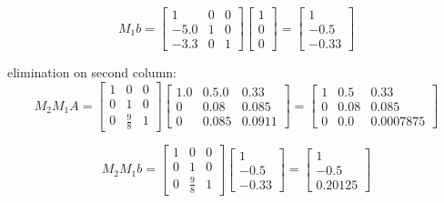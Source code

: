 \documentclass[11pt,twoside]{article}
\begin{document}
\begin{enumerate}
\begin{enumerate}
				 \[ M_1 b = 
				\left. \begin{bmatrix}
				1& 0 & 0 \\
				-5.0& 1&0\\
				-3.3& 0 &1 \end{bmatrix}
				 \right. 				 
				 \left. \begin{bmatrix} 
				1\\
				0   \\
				0  \end{bmatrix} \right. = 
				 \left. \begin{bmatrix} 
				1 \\
				-0.5\\
				-0.33 \end{bmatrix} \right. \] 
				
				elimination on second column: 
				\[ M_2M_1 A = 
				\left. \begin{bmatrix}
				1& 0 & 0 \\
				0& 1&0\\
				0& \frac{9}{8} &1 \end{bmatrix}
				 \right. 
				 \left. \begin{bmatrix}
				1.0 &0.5.0 & 0.33 \\
				0&0.08& 0.085 \\
				0& 0.085 & 0.0911\end{bmatrix}
				 \right. = 
				 \left. \begin{bmatrix}
				1 & 0.5 &0.33\\
				0 & 0.08 & 0.085 \\
				0 & 0.0 & 0.0007875 \end{bmatrix}
				 \right.\]
				 
				 \[M_2 M_1 b = 
				\left. \begin{bmatrix}
				1& 0 & 0 \\
				0& 1&0\\
				0& \frac{9}{8} &1 \end{bmatrix}
				 \right. 
				 \left. \begin{bmatrix} 
				1 \\
				-0.5\\
				-0.33\end{bmatrix} \right. = 
				 \left. \begin{bmatrix} 
				 
				1 \\
				-0.5 \\
				0.20125  \end{bmatrix} \right. \] 


\end{enumerate}
\end{enumerate}
\end{document}
